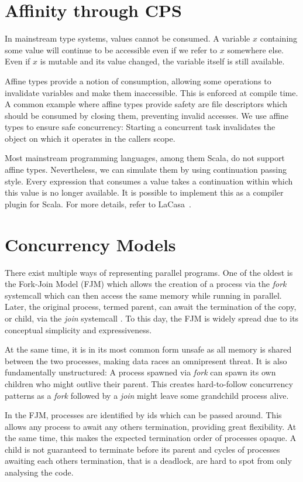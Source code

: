 \section{Affinity through CPS}
In mainstream type systems, values cannot be consumed. A variable $x$ containing some value will continue to be accessible even if we refer to $x$ somewhere else. Even if $x$ is mutable and its value changed, the variable itself is still available.

Affine types provide a notion of consumption, allowing some operations to invalidate variables and make them inaccessible. This is enforced at compile time. A common example where affine types provide safety are file descriptors which should be consumed by closing them, preventing invalid accesses. We use affine types to ensure safe concurrency: Starting a concurrent task invalidates the object on which it operates in the callers scope.

Most mainstream programming languages, among them Scala, do not support affine types. Nevertheless, we can simulate them by using continuation passing style. Every expression that consumes a value takes a continuation within which this value is no longer available. It is possible to implement this as a compiler plugin for Scala. For more details, refer to LaCasa~\cite{haller_lacasa_2016}.

\section{Concurrency Models}
There exist multiple ways of representing parallel programs. One of the oldest is the Fork-Join Model (FJM) which allows the creation of a process via the \textit{fork} systemcall which can then access the same memory while running in parallel. Later, the original process, termed parent, can await the termination of the copy, or child, via the \textit{join} systemcall \cite{noauthor_forkjoin_2023}. To this day, the FJM is widely spread due to its conceptual simplicity and expressiveness.

At the same time, it is in its most common form unsafe as all memory is shared between the two processes, making data races an omnipresent threat. It is also fundamentally unstructured: A process spawned via \textit{fork} can spawn its own children who might outlive their parent. This creates hard-to-follow concurrency patterns as a \textit{fork} followed by a \textit{join} might leave some grandchild process alive.

In the FJM, processes are identified by ids which can be passed around. This allows any process to await any others termination, providing great flexibility. At the same time, this makes the expected termination order of processes opaque. A child is not guaranteed to terminate before its parent and cycles of processes awaiting each others termination, that is a deadlock, are hard to spot from only analysing the code.


